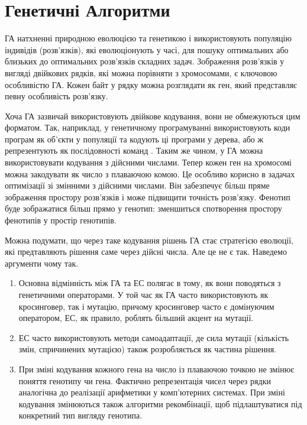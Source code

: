 \section{Генетичні Алгоритми}

ГА натхненні природною еволюцією та генетикою і використовують 
популяцію індивідів (розв'язків), які еволюціонують у часі, 
для пошуку оптимальних або близьких до оптимальних розв'язків складних задач. 
Зображення розв'язків у вигляді двійкових рядків, 
які можна порівняти з хромосомами, є ключовою особливістю ГА. 
Кожен байт у рядку можна розглядати як ген, який представляє 
певну особливість розв'язку.

Хоча ГА зазвичай використовують двійкове кодування, 
вони не обмежуються цим форматом. 
Так, наприклад, у генетичному програмуванні використовують
коди програм як об'єкти у популяції та кодують ці програми
у дерева, або ж репрезентують як послідовності команд 
\cite{slowikEvolutionaryAlgorithmsTheir2020, lukeEssentialsMetaheuristicsSet2013}.
Таким же чином, у ГА можна використовувати кодування з дійсними числами. 
Тепер кожен ген на хромосомі можна закодувати як число з плаваючою комою.
Це особливо корисно в задачах оптимізації зі змінними з дійсними числами. 
Він забезпечує більш пряме зображення простору розв'язків 
і може підвищити точність розв'язку. 
Фенотип буде зображатися більш прямо у генотип:
зменшиться спотворення простору фенотипів у простір генотипів.

Можна подумати, що через таке кодування рішень ГА стає
стратегією еволюції, які предтавляють рішення саме через
дійсні числа.
Але це не є так. Наведемо аргументи чому так.
\begin{enumerate}
\item Основна відмінність між ГА та ЕС полягає в тому, 
  як вони поводяться з генетичними операторами. 
  У той час як ГА часто використовують як кросинговер, 
  так і мутацію, причому кросинговер часто є домінуючим оператором, 
  ЕС, як правило, роблять більший акцент на мутації. 
\item ЕС часто використовують методи самоадаптації, 
  де сила мутації (кількість змін, спричинених мутацією) 
  також розробляється як частина рішення.
\item При зміні кодування кожного гена на число із плаваючою точкою
  не змінює поняття генотипу чи гена.
  Фактично репрезентація чисел через рядки аналогічна
  до реалізації арифметики у комп'ютерних системах.
  При зміні кодування змінюються також алгоритми
  рекомбінації, щоб підлаштуватися під конкретний тип
  вигляду генотипа.
\end{enumerate}

